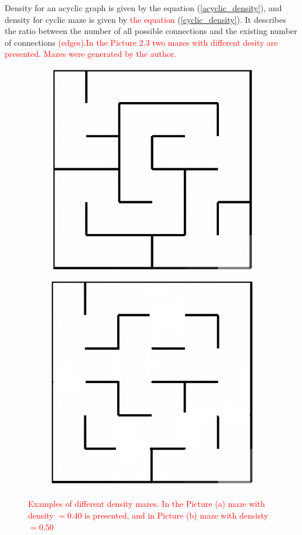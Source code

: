  Density for an acyclic graph is given by the equation (\ref{acyclic_density}), and density for cyclic maze is given by \textcolor{red}{the equation} (\ref{cyclic_density})\cite{SBorg}. It describes the ratio between the number of all possible connections and the existing number of connections \textcolor{red}{(edges)}.\textcolor{red}{In the Picture 2.3 two mazes with different desity are presented. Mazes were generated by the author.}
\begin{figure}[!h]
\centering
\begin{subfigure}{.5\textwidth}
\centering
\includegraphics[width=.5\linewidth]{recursivedens}
\caption{}
\label{fig:sub1}
\end{subfigure}%
\begin{subfigure}{.5\textwidth}
\centering
\includegraphics[width=.5\linewidth]{recursivedensecyclic}
\caption{}
\label{fig:sub2}
\end{subfigure}
\caption{\textcolor{red}{Examples of different density mazes. In the Picture (a) maze with density $= 0.40$ is presented, and in Picture (b) maze with densisty $ = 0.50$}}
\label{fig:test}
\end{figure}

\newpage
